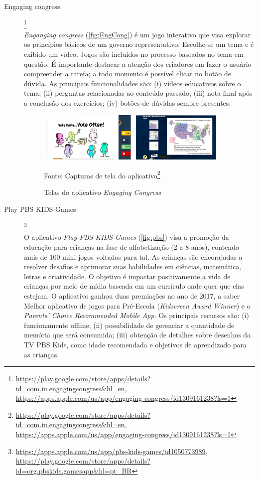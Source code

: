 \begin{description}

\item[Engaging congress]\footnote{\url{https://play.google.com/store/apps/details?id=com.iu.engagingcongress&hl=en}, \url{https://apps.apple.com/us/app/engaging-congress/id1309161238?ls=1}} \hfill \\
\textit{Enganging congress} (\autoref{fig:EngCong}) é um jogo interativo que visa explorar os princípios básicos de um governo representativo. Escolhe-se um tema e é exibido um vídeo. Jogos são incluídos no processo baseados no tema em questão. É importante destacar a atenção dos criadores em fazer o usuário compreender a tarefa; a todo momento é possível clicar no botão de dúvida. As principais funcionalidades são: (i) vídeos educativos sobre o tema; (ii) perguntas relacionadas ao conteúdo passado; (iii) nota final após a conclusão dos exercícios; (iv) botões de dúvidas sempre presentes.

\begin{figure}[ht!]
\centering
    \caption{Telas do aplicativo \textit{Engaging Congress}}
    \label{fig:EngCong}
    \includegraphics[width=0.9\textwidth]{Figuras/engagingcongress.png}
    
    Fonte: Capturas de tela do aplicativo\footnote{\url{https://play.google.com/store/apps/details?id=com.iu.engagingcongress&hl=en}, \url{https://apps.apple.com/us/app/engaging-congress/id1309161238?ls=1}}
\end{figure}

\item[Play PBS KIDS Games]\footnote{\url{https://apps.apple.com/us/app/pbs-kids-games/id1050773989}, \url{https://play.google.com/store/apps/details?id=org.pbskids.gamesapp&hl=pt_BR}} \hfill \\
O aplicativo \textit{Play PBS KIDS Games} (\autoref{fig:pbs}) visa a promoção da educação para crianças na fase de alfabetização (2 a 8 anos), contendo mais de 100 mini-jogos voltados para tal. As crianças são encorajadas a resolver desafios e aprimorar suas habilidades em ciências, matemática, letras e criatividade. O objetivo é impactar positivamente a vida de crianças por meio de mídia baseada em um currículo onde quer que elas estejam. O aplicativo ganhou duas premiações no ano de 2017, a saber Melhor aplicativo de jogos para Pré-Escola (\textit{Kidscreen Award Winner}) e o \textit{Parents' Choice Recommended Mobile App}. Os principais recursos são: (i) funcionamento offline; (ii) possibilidade de gerenciar a quantidade de memória que será consumida; (iii) obtenção de detalhes sobre desenhos da TV PBS Kids, como idade recomendada e objetivos de aprendizado para as crianças.


\end{description}
